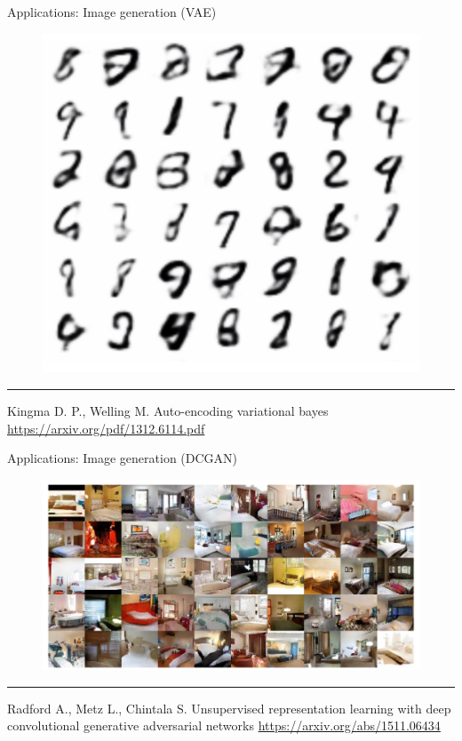 \documentclass{beamer}
\begin{document}
\begin{frame}{Applications: Image generation (VAE)}
    \begin{figure}
        \centering
        \includegraphics[width=0.5\linewidth]{figs/vae.png}
        \label{fig:vae}
    \end{figure}
\vfill
\hrule\medskip
{\scriptsize Kingma D. P., Welling M. Auto-encoding variational bayes \href{https://arxiv.org/pdf/1312.6114.pdf}{https://arxiv.org/pdf/1312.6114.pdf}}
\end{frame}
\begin{frame}{Applications: Image generation (DCGAN)}
    \begin{figure}
        \centering
        \includegraphics[width=1.0\linewidth]{figs/dcgan.png}
        \label{fig:dcgan}
    \end{figure}
\vfill
\hrule\medskip
{\scriptsize Radford A., Metz L., Chintala S. Unsupervised representation learning with deep convolutional generative adversarial networks  \href{https://arxiv.org/abs/1511.06434}{https://arxiv.org/abs/1511.06434}}
\end{frame}
\end{document}
